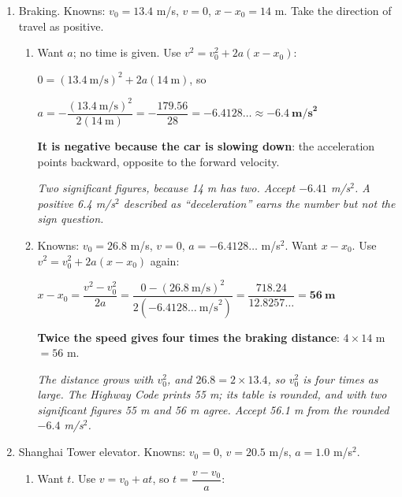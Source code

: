 \documentclass[12pt, twoside]{article}
\begin{document}
\begin{enumerate}[itemsep=0.5cm]
\begin{enumerate}[itemsep=0.3cm]
      $x - x_0 = \bar{v}\,t = 13.4~\text{m/s} \times 1.99~\text{s} = 26.666
      \approx \mathbf{26.7~\textbf{m}}$

      \emph{Also accept $x - x_0 = \frac{1}{2}at^2
      = \frac{1}{2}(13.467\ldots)(1.99)^2 \approx 26.7$ m. Using the rounded 13.5
      m/s$^2$ gives 26.73 m, which also rounds to 26.7 m.}
  \end{enumerate}

\newpage

\item Braking. Knowns: $v_0 = 13.4$ m/s, $v = 0$, $x - x_0 = 14$ m. Take the
  direction of travel as positive.
  \begin{enumerate}[itemsep=0.3cm]
    \item Want $a$; no time is given. Use $v^2 = v_0^2 + 2a(x - x_0)$:

      $0 = (13.4~\text{m/s})^2 + 2a(14~\text{m})$, \quad so

      $a = -\dfrac{(13.4~\text{m/s})^2}{2(14~\text{m})} = -\dfrac{179.56}{28}
      = -6.4128\ldots \approx \mathbf{-6.4~\textbf{m/s}^2}$

      \textbf{It is negative because the car is slowing down}: the acceleration points
      backward, opposite to the forward velocity.

      \emph{Two significant figures, because 14 m has two. Accept $-6.41$ m/s$^2$. A
      positive 6.4 m/s$^2$ described as ``deceleration'' earns the number but not the
      sign question.}
    \item Knowns: $v_0 = 26.8$ m/s, $v = 0$, $a = -6.4128\ldots$ m/s$^2$. Want
      $x - x_0$. Use $v^2 = v_0^2 + 2a(x - x_0)$ again:

      $x - x_0 = \dfrac{v^2 - v_0^2}{2a} = \dfrac{0 - (26.8~\text{m/s})^2}{2(-6.4128\ldots
      ~\text{m/s}^2)} = \dfrac{718.24}{12.8257\ldots} = \mathbf{56~\textbf{m}}$

      \textbf{Twice the speed gives four times the braking distance}: $4 \times 14$ m
      $= 56$ m.

      \emph{The distance grows with $v_0^2$, and $26.8 = 2 \times 13.4$, so
      $v_0^2$ is four times as large. The Highway Code prints 55 m; its table is
      rounded, and with two significant figures 55 m and 56 m agree. Accept 56.1 m
      from the rounded $-6.4$ m/s$^2$.}
  \end{enumerate}

\item Shanghai Tower elevator. Knowns: $v_0 = 0$, $v = 20.5$ m/s,
  $a = 1.0$ m/s$^2$.
  \begin{enumerate}[itemsep=0.3cm]
    \item Want $t$. Use $v = v_0 + at$, so $t = \dfrac{v - v_0}{a}$:


\end{enumerate}
\end{enumerate}
\end{document}
